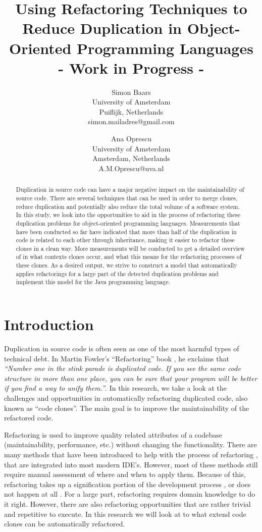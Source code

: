 \documentclass[a4paper]{article}
\title{Using Refactoring Techniques to Reduce Duplication in Object-Oriented Programming Languages\\- Work in Progress -}
\author{
Simon Baars \\ University of Amsterdam\\
                Puiflijk, Netherlands \\ simon.mailadres@gmail.com
\and
Ana Oprescu \\ University of Amsterdam\\
                Amsterdam, Netherlands \\ A.M.Oprescu@uva.nl
}
\begin{document}
\maketitle

\begin{abstract}
Duplication in source code can have a major negative impact on the maintainability of source code. There are several techniques that can be used in order to merge clones, reduce duplication and potentially also reduce the total volume of a software system. In this study, we look into the opportunities to aid in the process of refactoring these duplication problems for object-oriented programming languages. Measurements that have been conducted so far have indicated that more than half of the duplication in code is related to each other through inheritance, making it easier to refactor these clones in a clean way. More measurements will be conducted to get a detailed overview of in what contexts clones occur, and what this means for the refactoring processes of these clones. As a desired output, we strive to construct a model that automatically applies refactorings for a large part of the detected duplication problems and implement this model for the Java programming language.
\end{abstract}


\section{Introduction}
Duplication in source code is often seen as one of the most harmful types of technical debt. In Martin Fowler's ``Refactoring'' book \cite{fowler1999refactoring}, he exclaims that \textit{``Number one in the stink parade is duplicated code. If you see the same code structure in more than one place, you can be sure that your program will be better if you find a way to unify them.''}. In this research, we take a look at the challenges and opportunities in automatically refactoring duplicated code, also known as ``code clones''. The main goal is to improve the maintainability of the refactored code.

Refactoring is used to improve quality related attributes of a codebase (maintainability, performance, etc.) without changing the functionality. There are many methods that have been introduced to help with the process of refactoring \cite{fowler1999refactoring, wake2004refactoring}, that are integrated into most modern IDE's. However, most of these methods still require manual assessment of where and when to apply them. Because of this, refactoring takes up a signification portion of the development process \cite{lientz1978characteristics, mens2004survey}, or does not happen at all \cite{mens2003refactoring}. For a large part, refactoring requires domain knowledge to do it right. However, there are also refactoring opportunities that are rather trivial and repetitive to execute. In this research we will look at to what extend code clones can be automatically refactored.
\end{document}
